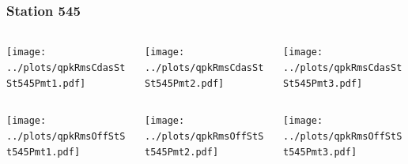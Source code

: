 \documentclass[aspectratio=169]{beamer}
\begin{document}
\begin{frame} 
  \frametitle{Station 545}
  \begin{center}
    \begin{columns}
      \begin{column}{0.33\textwidth}
        \texttt{[image: ../plots/qpkRmsCdasStSt545Pmt1.pdf]}
      \end{column}
      \begin{column}{0.33\textwidth}
        \texttt{[image: ../plots/qpkRmsCdasStSt545Pmt2.pdf]}
      \end{column}
      \begin{column}{0.33\textwidth}
        \texttt{[image: ../plots/qpkRmsCdasStSt545Pmt3.pdf]}
      \end{column}
    \end{columns}
  \end{center}

  \begin{center}
    \begin{columns}
      \begin{column}{0.33\textwidth}
        \texttt{[image: ../plots/qpkRmsOffStSt545Pmt1.pdf]}
      \end{column}
      \begin{column}{0.33\textwidth}
        \texttt{[image: ../plots/qpkRmsOffStSt545Pmt2.pdf]}
      \end{column}
      \begin{column}{0.33\textwidth}
        \texttt{[image: ../plots/qpkRmsOffStSt545Pmt3.pdf]}
      \end{column}
    \end{columns}
  \end{center}
\end{frame}
\end{document}

